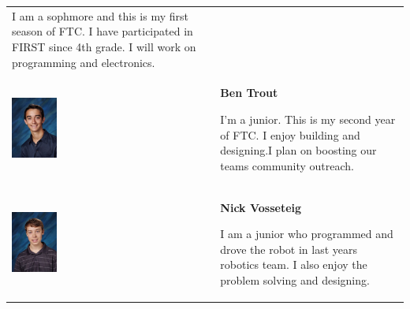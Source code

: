 \begin{tabular}{p{2cm}b{8cm}}
 \medskip 

 I am a sophmore and this is my first season of FTC. I have participated in FIRST since 4th grade. I will work on programming and electronics.\\
 
 \includegraphics[height=2cm,keepaspectratio=true]{./TeamSection/TroutBen.jpg}&

 \textbf{Ben Trout}
 
 \medskip
 
 I'm a junior. This is my second year of FTC. I enjoy building and designing.I plan on boosting our teams community outreach. \\
 
 \includegraphics[height=2cm,keepaspectratio=true]{./TeamSection/VosseteigNick.jpg}&

 \textbf{Nick Vosseteig}
 
 \medskip
 
 I am a junior who programmed and drove the robot in last years robotics team. I also enjoy the problem solving and designing.\\
\end{tabular} 